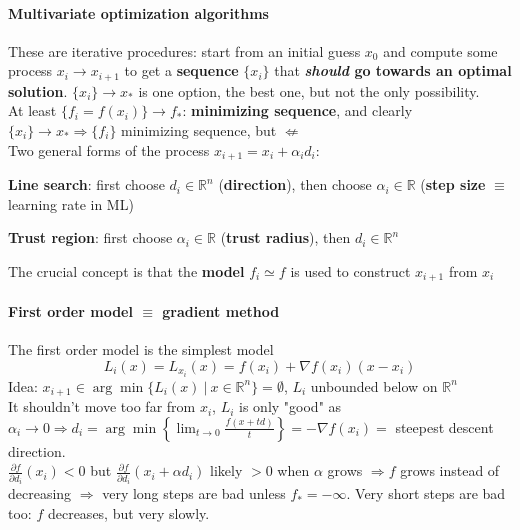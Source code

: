 \documentclass[10pt]{report}
\begin{document}
\paragraph{Multivariate optimization algorithms} These are iterative procedures: start from an initial guess $x_0$ and compute some process $x_i \longrightarrow x_{i+1}$ to get a \textbf{sequence} $\{x_i\}$ that \textbf{\textit{should} go towards an optimal solution}. $\{x_i\}\rightarrow x_*$ is one option, the best one, but not the only possibility.\\
At least $\{f_i = f(x_i)\} \rightarrow f_*$: \textbf{minimizing sequence}, and clearly $\{x_i\}\rightarrow x_* \Rightarrow \{f_i\}$ minimizing sequence, but $\not\Leftarrow$\\
Two general forms of the process $x_{i+1} = x_i + \alpha_id_i$:
\begin{list}{}{}
	\item \textbf{Line search}: first choose $d_i\in \mathbb{R}^n$ (\textbf{direction}), then choose $\alpha_i\in \mathbb{R}$ (\textbf{step size} $\equiv$ learning rate in ML)
	\item \textbf{Trust region}: first choose $\alpha_i\in \mathbb{R}$ (\textbf{trust radius}), then $d_i\in \mathbb{R}^n$
\end{list}
The crucial concept is that the \textbf{model} $f_i \simeq f$ is used to construct $x_{i+1}$ from $x_i$
\paragraph{First order model $\equiv$ gradient method} The first order model is the simplest model $$L_i(x) = L_{x_i}(x) = f(x_i) + \nabla f(x_i)(x-x_i)$$ Idea: $x_{i+1} \in \arg\min\{L_i(x)\:|\:x\in \mathbb{R}^n\} = \emptyset$, $L_i$ unbounded below on $\mathbb{R}^n$\\
It shouldn't move too far from $x_i$, $L_i$ is only "good" as $\alpha_i\rightarrow 0 \Rightarrow d_i = \arg\min\left\{\lim_{t\to 0} \frac{f(x+td)}{t}\right\} = -\nabla f(x_i) =$ steepest descent direction.\\
$\frac{\partial f}{\partial d_i}(x_i) < 0$ but $\frac{\partial f}{\partial d_i}(x_i + \alpha d_i)$ likely $> 0$ when $\alpha$ grows $\Rightarrow f$ grows instead of decreasing $\Rightarrow$ very long steps are bad unless $f_* = -\infty$. Very short steps are bad too: $f$ decreases, but very slowly.
\end{document}

